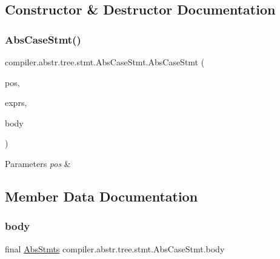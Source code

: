 \subsection{Constructor \& Destructor Documentation}
\mbox{\label{classcompiler_1_1abstr_1_1tree_1_1stmt_1_1_abs_case_stmt_aea00a14182b44b764f9d4eed67c69094}} 
\subsubsection{\texorpdfstring{Abs\+Case\+Stmt()}{AbsCaseStmt()}}
{\footnotesize\ttfamily compiler.\+abstr.\+tree.\+stmt.\+Abs\+Case\+Stmt.\+Abs\+Case\+Stmt (\begin{DoxyParamCaption}\item[{\hyperlink{classcompiler_1_1_position}{Position}}]{pos,  }\item[{Linked\+List$<$ \hyperlink{classcompiler_1_1abstr_1_1tree_1_1expr_1_1_abs_expr}{Abs\+Expr} $>$}]{exprs,  }\item[{\hyperlink{classcompiler_1_1abstr_1_1tree_1_1_abs_stmts}{Abs\+Stmts}}]{body }\end{DoxyParamCaption})}


\begin{DoxyParams}{Parameters}
{\em pos} & \\
\hline
\end{DoxyParams}


\subsection{Member Data Documentation}
\mbox{\label{classcompiler_1_1abstr_1_1tree_1_1stmt_1_1_abs_case_stmt_acf394ef22ceec4ec4ca843188d71fd30}} 
\subsubsection{\texorpdfstring{body}{body}}
{\footnotesize\ttfamily final \hyperlink{classcompiler_1_1abstr_1_1tree_1_1_abs_stmts}{Abs\+Stmts} compiler.\+abstr.\+tree.\+stmt.\+Abs\+Case\+Stmt.\+body}

